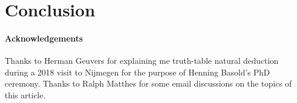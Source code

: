 \documentclass[a4paper,USenglish,cleveref, autoref, thm-restate]{lipics-v2019}
\begin{document}
\section{Conclusion}
\label{sec:concl}

\paragraph*{Acknowledgements}  Thanks to Herman Geuvers for explaining
me truth-table natural deduction during a 2018 visit to Nijmegen for
the purpose of Henning Basold's PhD ceremony.  Thanks to Ralph Matthes
for some email discussions on the topics of this article.






\end{document}
